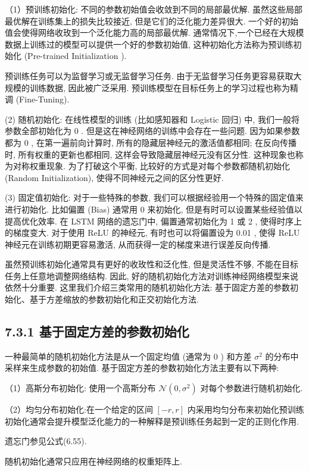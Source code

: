 \documentclass[10pt]{article}
\begin{document}
（1）预训练初始化: 不同的参数初始值会收敛到不同的局部最优解. 虽然这些局部最优解在训练集上的损失比较接近, 但是它们的泛化能力差异很大. 一个好的初始值会使得网络收玫到一个泛化能力高的局部最优解. 通常情况下,一个已经在大规模数据上训练过的模型可以提供一个好的参数初始值, 这种初始化方法称为预训练初始化 (Pre-trained Initialization ).

预训练任务可以为监督学习或无监督学习任务. 由于无监督学习任务更容易获取大规模的训练数据, 因此被广泛采用. 预训练模型在目标任务上的学习过程也称为精调 (Fine-Tuning).

(2) 随机初始化: 在线性模型的训练 (比如感知器和 Logistic 回归) 中, 我们一般将参数全部初始化为 0 . 但是这在神经网络的训练中会存在一些问题. 因为如果参数都为 0 , 在第一遍前向计算时, 所有的隐藏层神经元的激活值都相同; 在反向传播时, 所有权重的更新也都相同, 这样会导致隐藏层神经元没有区分性. 这种现象也称为对称权重现象. 为了打破这个平衡, 比较好的方式是对每个参数都随机初始化 (Random Initialization), 使得不同神经元之间的区分性更好.

(3) 固定值初始化: 对于一些特殊的参数, 我们可以根据经验用一个特殊的固定值来进行初始化. 比如偏置 (Bias) 通常用 0 来初始化, 但是有时可以设置某些经验值以提高优化效率. 在 LSTM 网络的遗忘门中, 偏置通常初始化为 1 或 2 , 使得时序上的梯度变大. 对于使用 ReLU 的神经元, 有时也可以将偏置设为 0.01 , 使得 ReLU 神经元在训练初期更容易激活, 从而获得一定的梯度来进行误差反向传播.

虽然预训练初始化通常具有更好的收玫性和泛化性, 但是灵活性不够, 不能在目标任务上任意地调整网络结构. 因此, 好的随机初始化方法对训练神经网络模型来说依然十分重要. 这里我们介绍三类常用的随机初始化方法: 基于固定方差的参数初始化、基于方差缩放的参数初始化和正交初始化方法.

\subsection*{7.3.1 基于固定方差的参数初始化}
一种最简单的随机初始化方法是从一个固定均值 (通常为 0 ) 和方差 $\sigma^{2}$ 的分布中采样来生成参数的初始值. 基于固定方差的参数初始化方法主要有以下两种:

（1）高斯分布初始化: 使用一个高斯分布 $\mathcal{N}\left(0, \sigma^{2}\right)$ 对每个参数进行随机初始化.

（2）均匀分布初始化:在一个给定的区间 $[-r, r]$ 内采用均匀分布来初始化预训练初始化通常会提升模型泛化能力的一种解释是预训练任务起到一定的正则化作用.

遗忘门参见公式(6.55).

随机初始化通常只应用在神经网络的权重矩阵上.
\end{document}
